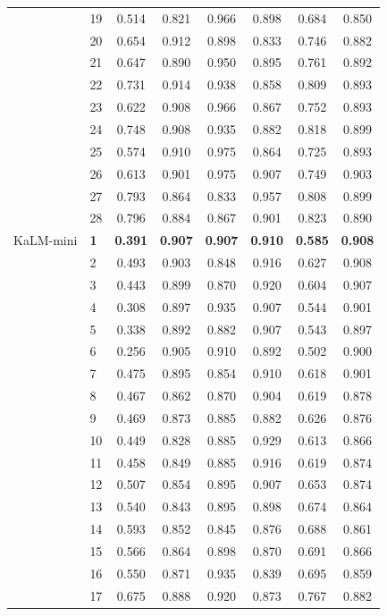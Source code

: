\begin{longtable}{llcccccc}
 & 19 & 0.514 & 0.821 & 0.966 & 0.898 & 0.684 & 0.850 \\
 & 20 & 0.654 & 0.912 & 0.898 & 0.833 & 0.746 & 0.882 \\
 & 21 & 0.647 & 0.890 & 0.950 & 0.895 & 0.761 & 0.892 \\
 & 22 & 0.731 & 0.914 & 0.938 & 0.858 & 0.809 & 0.893 \\
 & 23 & 0.622 & 0.908 & 0.966 & 0.867 & 0.752 & 0.893 \\
 & 24 & 0.748 & 0.908 & 0.935 & 0.882 & 0.818 & 0.899 \\
 & 25 & 0.574 & 0.910 & 0.975 & 0.864 & 0.725 & 0.893 \\
 & 26 & 0.613 & 0.901 & 0.975 & 0.907 & 0.749 & 0.903 \\
 & 27 & 0.793 & 0.864 & 0.833 & 0.957 & 0.808 & 0.899 \\
 & 28 & 0.796 & 0.884 & 0.867 & 0.901 & 0.823 & 0.890 \\
\midrule
KaLM-mini & \textbf{1} & \textbf{0.391} & \textbf{0.907} & \textbf{0.907} & \textbf{0.910} & \textbf{0.585} & \textbf{0.908} \\
 & 2 & 0.493 & 0.903 & 0.848 & 0.916 & 0.627 & 0.908 \\
 & 3 & 0.443 & 0.899 & 0.870 & 0.920 & 0.604 & 0.907 \\
 & 4 & 0.308 & 0.897 & 0.935 & 0.907 & 0.544 & 0.901 \\
 & 5 & 0.338 & 0.892 & 0.882 & 0.907 & 0.543 & 0.897 \\
 & 6 & 0.256 & 0.905 & 0.910 & 0.892 & 0.502 & 0.900 \\
 & 7 & 0.475 & 0.895 & 0.854 & 0.910 & 0.618 & 0.901 \\
 & 8 & 0.467 & 0.862 & 0.870 & 0.904 & 0.619 & 0.878 \\
 & 9 & 0.469 & 0.873 & 0.885 & 0.882 & 0.626 & 0.876 \\
 & 10 & 0.449 & 0.828 & 0.885 & 0.929 & 0.613 & 0.866 \\
 & 11 & 0.458 & 0.849 & 0.885 & 0.916 & 0.619 & 0.874 \\
 & 12 & 0.507 & 0.854 & 0.895 & 0.907 & 0.653 & 0.874 \\
 & 13 & 0.540 & 0.843 & 0.895 & 0.898 & 0.674 & 0.864 \\
 & 14 & 0.593 & 0.852 & 0.845 & 0.876 & 0.688 & 0.861 \\
 & 15 & 0.566 & 0.864 & 0.898 & 0.870 & 0.691 & 0.866 \\
 & 16 & 0.550 & 0.871 & 0.935 & 0.839 & 0.695 & 0.859 \\
 & 17 & 0.675 & 0.888 & 0.920 & 0.873 & 0.767 & 0.882 \\

\end{longtable}
